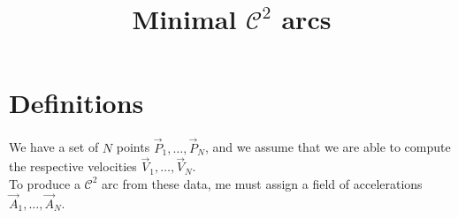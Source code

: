 \documentclass[aps,12pt]{revtex4}
\begin{document}
\title{Minimal $\mathcal{C}^2$ arcs}
\maketitle

\section{Definitions}
We have a set of $N$ points $\vec{P}_1,\ldots,\vec{P}_N$, and we assume
that we are able to compute the respective velocities  $\vec{V}_1,\ldots,\vec{V}_N$.\\
To produce a $\mathcal{C}^2$ arc from these data, me must assign a field of accelerations $\vec{A}_1,\ldots,\vec{A}_N$.
\end{document}
